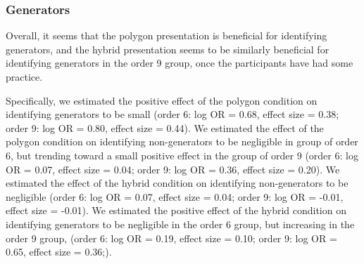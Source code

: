 \documentclass[man,10pt]{apa6}
\begin{document}
\subsubsection{Generators} 
Overall, it seems that the polygon presentation is beneficial for identifying generators, and the hybrid presentation seems to be similarly beneficial for identifying generators in the order 9 group, once the participants have had some practice. \par 
Specifically, we estimated the positive effect of the polygon condition on identifying generators to be small (order 6: log OR = 0.68, effect size = 0.38; order 9: log OR = 0.80, effect size = 0.44). We estimated the effect of the polygon condition on identifying non-generators to be negligible in group of order 6, but trending toward a small positive effect in the group of order 9 (order 6: log OR = 0.07, effect size = 0.04; order 9: log OR = 0.36, effect size = 0.20). We estimated the effect of the hybrid condition on identifying non-generators to be negligible (order 6: log OR = 0.07, effect size = 0.04; order 9: log OR = -0.01, effect size = -0.01). We estimated the positive effect of the hybrid condition on identifying generators to be negligible in the order 6 group, but increasing in the order 9 group, (order 6: log OR = 0.19, effect size = 0.10; order 9: log OR = 0.65, effect size = 0.36;). \par
\end{document}
